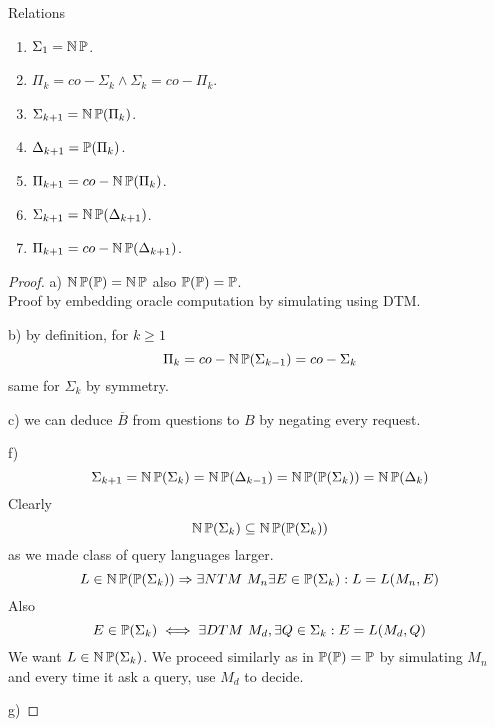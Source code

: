 \begin{theorem} Relations
	\begin{enumerate}[label=\alph*)]
		\item $\Sigma_1 = \TNP $.
		\item $\Pi_k = co-\Sigma_k \land \Sigma_k = co-\Pi_k$.
		\item $\Sigma_{k + 1} = \TNP(\Pi_k)$.
		\item $\Delta_{k + 1} = \TP(\Pi_k)$.
		\item $\Pi_{k + 1} = co-\TNP(\Pi_k)$.
		\item $\Sigma_{k + 1} = \TNP(\Delta_{k + 1})$.
		\item $\Pi_{k + 1} = co-\TNP(\Delta_{k + 1})$.
	\end{enumerate}
\end{theorem}
\begin{proof}
	a) $\TNP(\TP) = \TNP$ also $\TP(\TP) = \TP$.\\
	Proof by embedding oracle computation by simulating using DTM.

	b) by definition, for $k \geq 1$
	\[ \Pi_k = co-\TNP(\Sigma_{k - 1}) = co-\Sigma_k \]
	same for $\Sigma_k$ by symmetry.

	c) we can deduce $\overline{B}$ from questions to $B$ by negating every request.


	f)
	\[ \Sigma_{k + 1} = \TNP(\Sigma_k) = \TNP(\Delta_{k - 1}) = \TNP(\TP(\Sigma_k)) = \TNP(\Delta_k) \]
	Clearly
	\[ \TNP(\Sigma_k) \subseteq \TNP(\TP(\Sigma_k)) \]
	as we made class of query languages larger.
	\[ L \in \TNP(\TP(\Sigma_k)) \Rightarrow \exists NTM\ M_n \exists E \in \TP(\Sigma_k): L = L(M_n, E) \]
	Also
	\[ E \in \TP(\Sigma_k) \iff \exists DTM\ M_d, \exists Q \in \Sigma_k: E = L(M_d, Q) \]
	We want $L \in \TNP(\Sigma_k)$.
	We proceed similarly as in $\TP(\TP) = \TP$ by simulating $M_n$ and every time it ask a query, use $M_d$ to decide.

	g)

\end{proof}

